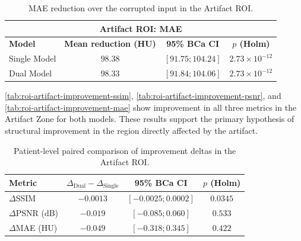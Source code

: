 \begin{table}[htbp]
\centering
\small
\begin{tabular}{lccc}
\multicolumn{4}{c}{\textbf{Artifact ROI: MAE}} \\[3pt]
\toprule
\textbf{Model} & \textbf{Mean reduction (HU)} & \textbf{95\% BCa CI} & \textbf{$p$ (Holm)} \\
\midrule
Single Model & $98.38$ & $[91.75; 104.24]$ & $2.73\times10^{-12}$ \\
Dual Model & $98.33$ & $[91.84; 104.06]$ & $2.73\times10^{-12}$ \\
\bottomrule
\end{tabular}
\captionsetup{skip=2pt}
\caption[Artifact-ROI MAE reduction]{MAE reduction over the corrupted input in the Artifact ROI.}
\label{tab:roi-artifact-improvement-mae}
\end{table}
\FloatBarrier

\autoref{tab:roi-artifact-improvement-ssim}, \autoref{tab:roi-artifact-improvement-psnr}, and \autoref{tab:roi-artifact-improvement-mae} show improvement in all three metrics in the Artifact Zone for both models. These results support the primary hypothesis of structural improvement in the region directly affected by the artifact.

\begin{table}[htbp]
\centering
\small
\begin{tabular}{lccc}
\toprule
\textbf{Metric} & \textbf{$\Delta_{\mathrm{Dual}}-\Delta_{\mathrm{Single}}$} & \textbf{95\% BCa CI} & \textbf{$p$ (Holm)} \\
\midrule
$\Delta$SSIM & $-0.0013$ & $[-0.0025; 0.0002]$ & $0.0345$ \\
$\Delta$PSNR (dB) & $-0.019$ & $[-0.085; 0.060]$ & $0.533$ \\
$\Delta$MAE (HU) & $-0.049$ & $[-0.318; 0.345]$ & $0.422$ \\
\bottomrule
\end{tabular}
\captionsetup{skip=2pt}
\caption[Paired Artifact-ROI improvement comparison]{Patient-level paired comparison of improvement deltas in the Artifact ROI.}
\label{tab:roi-artifact-paired-comparison}
\end{table}
\FloatBarrier


